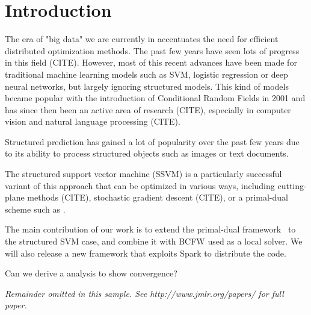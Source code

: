 \section{Introduction}

The era of "big data" we are currently in accentuates the need for efficient distributed optimization methods. The past few years have seen lots of progress in this field (CITE). However, most of this recent advances have been made for traditional machine learning models such as SVM, logistic regression or deep neural networks, but largely ignoring structured models. This kind of models became popular with the introduction of Conditional Random Fields in 2001 and has since then been an active area of research (CITE), especially in computer vision and natural language processing (CITE).

Structured prediction has gained a lot of popularity over the past few years due to its ability to process structured objects such as images or text documents. 

The structured support vector machine (SSVM) is a particularly successful variant of this approach that can be optimized in various ways, including cutting-plane methods (CITE), stochastic gradient descent (CITE), or a primal-dual scheme such as \citep{LacosteJulien:2013ue}. 

The main contribution of our work is to extend the primal-dual \cocoap framework~\citep{Jaggi:2014vi,Ma:2015ti} to the structured SVM case, and combine it with BCFW \citep{LacosteJulien:2013ue} used as a local solver. We will also release a new framework that exploits Spark to distribute the code.

Can we derive a analysis to show convergence?

{\noindent \em Remainder omitted in this sample. See http://www.jmlr.org/papers/ for full paper.}
